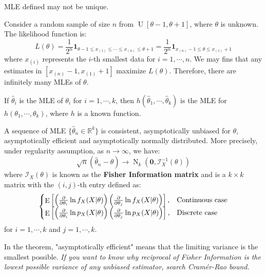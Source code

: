 \documentclass{huhtakm-template-book-v2}
\DeclareMathOperator{\E}{E}
\DeclareMathOperator{\N}{N}
\DeclareMathOperator{\U}{U}
\begin{document}
\newpage
\begin{rem}
	MLE defined may not be unique.
\end{rem}
\begin{eg}
	Consider a random sample of size $n$ from $\U[\theta-1,\theta+1]$, where $\theta$ is unknown. The likelihood function is:
	\begin{equation*}
		L(\theta)=\frac{1}{2^{n}}\mathbf{1}_{\theta-1\leq x_{(1)}\leq\cdots\leq x_{(n)}\leq\theta+1}=\frac{1}{2^{n}}\mathbf{1}_{x_{(n)}-1\leq\theta\leq x_{(1)}+1}
	\end{equation*}
	where $x_{(i)}$ represents the $i$-th smallest data for $i=1,\cdots,n$. We may fins that any estimates in $[x_{(n)}-1,x_{(1)}+1]$ maximize $L(\theta)$. Therefore, there are infinitely many MLEs of $\theta$.
\end{eg}
\begin{lem}
	If $\hat{\theta}_{i}$ is the MLE of $\theta_{i}$ for $i=1,\cdots,k$, then $h(\hat{\theta}_{1},\cdots,\hat{\theta}_{k})$ is the MLE for $h(\theta_{1},\cdots,\theta_{k})$, where $h$ is a known function.
\end{lem}
\begin{thm}
	\label{Chapter 2 (Thoerem) Sequence of MLE is asympt. normal}
	A sequence of MLE $\{\hat{\theta}_{n}\in\mathbb{R}^{k}\}$ is consistent, asymptotically unbiased for $\theta$, asymptotically efficient and asymptotically normally distributed. More precisely, under regularity assumption, as $n\to\infty$, we have:
	\begin{equation*}
		\sqrt{n}(\hat{\theta}_{n}-\theta)\to\N_{k}(\mathbf{0},\mathcal{I}_{X}^{-1}(\theta))
	\end{equation*}
	where $\mathcal{I}_{X}(\theta)$ is known as the \textbf{Fisher Information matrix} and is a $k\times k$ matrix with the $(i,j)$-th entry defined as:
	\begin{equation*}
		\begin{cases}
			\E\left[\left(\pdv*{\ln{f_{X}(X|\theta)}}{\theta_{i}}\right)\left(\pdv*{\ln{f_{X}(X|\theta)}}{\theta_{j}}\right)\right], &\text{Continuous case}\\
			\E\left[\left(\pdv*{\ln{p_{X}(X|\theta)}}{\theta_{i}}\right)\left(\pdv*{\ln{p_{X}(X|\theta)}}{\theta_{j}}\right)\right], &\text{Discrete case}
		\end{cases}
	\end{equation*}
	for $i=1,\cdots,k$ and $j=1,\cdots,k$.
\end{thm}
\begin{rem}
	In the theorem, "asymptotically efficient" means that the limiting variance is the smallest possible. \textit{If you want to know why reciprocal of Fisher Information is the lowest possible variance of any unbiased estimator, search Cram\'er-Rao bound.}
\end{rem}
\end{document}

